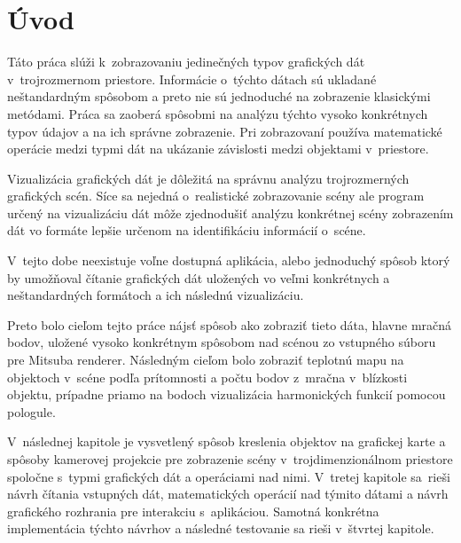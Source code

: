 
%

\chapter{Úvod}
\label{Uvod}
Táto práca slúži k~zobrazovaniu jedinečných typov grafických dát v~trojrozmernom priestore. Informácie o~týchto dátach sú ukladané neštandardným spôsobom a preto nie sú jednoduché na zobrazenie klasickými metódami. Práca sa zaoberá spôsobmi na analýzu týchto vysoko konkrétnych typov údajov a na ich správne zobrazenie. Pri zobrazovaní používa matematické operácie medzi typmi dát na ukázanie závislosti medzi objektami v~priestore.

Vizualizácia grafických dát je dôležitá na správnu analýzu trojrozmerných grafických scén. Síce sa nejedná o~realistické zobrazovanie scény ale program určený na vizualizáciu dát môže zjednodušiť analýzu konkrétnej scény zobrazením dát vo formáte lepšie určenom na identifikáciu informácií o~scéne.

V~tejto dobe neexistuje voľne dostupná aplikácia, alebo jednoduchý spôsob ktorý by umožňoval čítanie grafických dát uložených vo veľmi konkrétnych a neštandardných formátoch a ich následnú vizualizáciu.

Preto bolo cieľom tejto práce nájsť spôsob ako zobraziť tieto dáta, hlavne mračná bodov, uložené vysoko konkrétnym spôsobom nad scénou zo vstupného súboru pre Mitsuba renderer. Následným cieľom bolo zobraziť teplotnú mapu na objektoch v~scéne podľa prítomnosti a počtu bodov z~mračna v~blízkosti objektu, prípadne priamo na bodoch vizualizácia harmonických funkcií pomocou pologule.

 V~následnej kapitole je vysvetlený spôsob kreslenia objektov na grafickej karte a spôsoby kamerovej projekcie pre zobrazenie scény v~trojdimenzionálnom priestore spoločne s~typmi grafických dát a operáciami nad nimi. V~tretej kapitole sa~rieši návrh čítania vstupných dát, matematických operácií nad týmito dátami a návrh grafického rozhrania pre interakciu s~aplikáciou. Samotná konkrétna implementácia týchto návrhov a následné testovanie sa rieši v~štvrtej kapitole.

